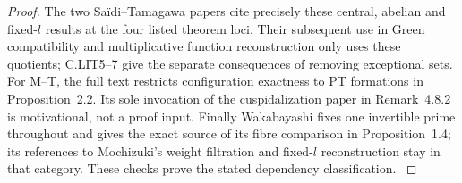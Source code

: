 \begin{proof}
The two Sa\"idi--Tamagawa papers cite precisely these central,
abelian and fixed-$l$ results at the four listed theorem loci.
Their subsequent use in Green compatibility and multiplicative
function reconstruction only uses these quotients; C.LIT5--7
give the separate consequences of removing exceptional sets.
For M--T, the full text restricts configuration exactness to
PT formations in Proposition~2.2. Its sole invocation of the
cuspidalization paper in Remark~4.8.2 is motivational, not a
proof input. Finally Wakabayashi fixes one invertible prime
throughout and gives the exact source of its fibre comparison
in Proposition~1.4; its references to Mochizuki's weight
filtration and fixed-$l$ reconstruction stay in that category.
These checks prove the stated dependency classification.
\citep[Propositions~1.8,1.12,1.14--1.16,1.19,3.8--3.9;
Theorem~3.10]{LA_Mochizuki2007}
\citep[Proposition~2.2, Remark~4.8.2]{LA_MT2008}
\citep[\S2, Remark~3.14]{LA_ST2009}
\citep[\S3]{LA_ST2017}
\citep[Proposition~1.4, Theorems~3.9,4.4]{LA_Wakabayashi2016}
\end{proof}
